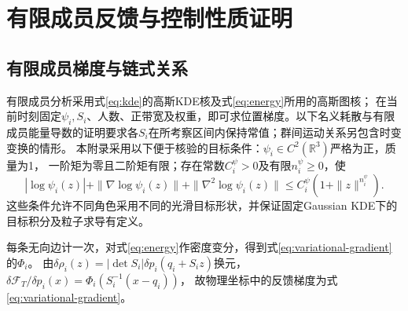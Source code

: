 \documentclass[UTF8,a4paper,11pt,fontset=none]{ctexart}
\newcommand{\R}{\mathbb R}\newcommand{\KL}{\operatorname{KL}}
\begin{document}
\appendix
\section{有限成员反馈与控制性质证明}\label{app:interfaces}

\subsection{有限成员梯度与链式关系}\label{app:graph-query}\label{app:template-conditions}
有限成员分析采用式\eqref{eq:kde}的高斯KDE核及式\eqref{eq:energy}所用的高斯图核；
在当前时刻固定$\psi_i,S_i$、人数、正带宽及权重，即可求位置梯度。以下名义耗散与有限成员能量导数的证明要求各$S_i$在所考察区间内保持常值；群间运动关系另包含时变变换的情形。
本附录采用以下便于核验的目标条件：$\psi_i\in C^2(\R^3)$严格为正，质量为1，
一阶矩为零且二阶矩有限；存在常数$C_i^\psi>0$及有限$n_i^\psi\ge0$，使
\[
|\log\psi_i(z)|+\|\nabla\log\psi_i(z)\|+\|\nabla^2\log\psi_i(z)\|
\le C_i^\psi(1+\|z\|^{n_i^\psi}).
\]
这些条件允许不同角色采用不同的光滑目标形状，并保证固定Gaussian KDE下的目标积分及粒子求导有定义。

每条无向边计一次，对式\eqref{eq:energy}作密度变分，得到式\eqref{eq:variational-gradient}的$\Phi_i$。
由$\delta\rho_i(z)=|\det S_i|\delta p_i(q_i+S_i z)$换元，
$\delta\mathcal F_T/\delta p_i(x)=\Phi_i(S_i^{-1}(x-q_i))$，
故物理坐标中的反馈梯度为式\eqref{eq:variational-gradient}。
\end{document}
